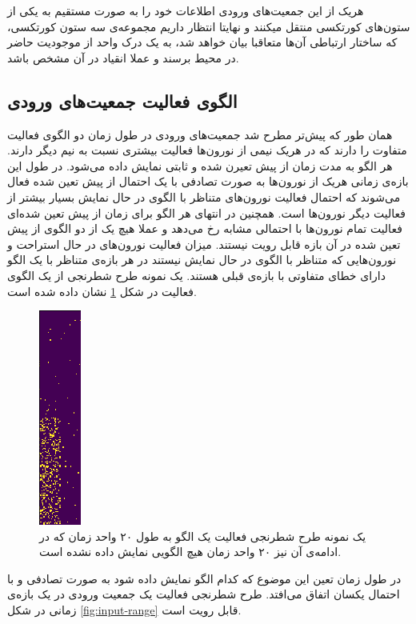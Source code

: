 \documentclass[12pt]{report}
\begin{document}
	هریک از این جمعیت‌های ورودی اطلاعات خود‌ را به صورت مستقیم به یکی از ستون‌های کورتکسی منتقل میکنند و نهایتا انتظار داریم مجموعه‌ی سه ستون کورتکسی، که ساختار ارتباطی آن‌ها متعاقبا بیان خواهد شد، به یک درک واحد از موجودیت حاضر در محیط برسند و عملا انقیاد در آن مشخص باشد.
	
	
	\subsection{الگوی فعالیت جمعیت‌های ورودی}
	
	همان طور که پیش‌تر مطرح شد جمعیت‌های ورودی در طول زمان دو الگوی فعالیت متفاوت را دارند که در هر‌یک نیمی از نورون‌ها فعالیت بیشتری نسبت به نیم دیگر دارند. هر الگو به مدت زمان از پیش تعیرن شده و ثابتی نمایش داده می‌شود. در طول این بازه‌ی زمانی هریک از نورون‌ها به صورت تصادفی با یک احتمال از پیش تعین شده فعال می‌شوند که احتمال فعالیت نورون‌های متناظر با الگوی در حال نمایش بسیار بیشتر از فعالیت دیگر نورون‌ها است. همچنین در انتهای هر الگو برای زمان از پیش تعین شده‌ای فعالیت تمام نورون‌ها با احتمالی مشابه رخ می‌دهد  و عملا هیچ یک از دو الگوی از پیش تعین شده در آن بازه قابل رویت نیستند. میزان فعالیت نورون‌های در حال استراحت و نورون‌هایی که متناظر با الگوی در حال نمایش نیستند در هر بازه‌ی متناظر با یک الگو دارای خطای متفاوتی با بازه‌ی قبلی هستند. یک نمونه طرح شطرنجی از یک الگوی فعالیت در شکل \ref{fig:input-single} نشان داده شده است.
	
\begin{figure}[H]
	\centering
	\includegraphics[width=0.1\linewidth]{input-single.png}
	\caption[NS]{
		یک نمونه طرح شطرنجی فعالیت یک الگو به طول ۲۰ واحد زمان که در ادامه‌ی آن نیز ۲۰ واحد زمان هیچ الگویی نمایش داده نشده است.
	}
	\label{fig:input-single} 
\end{figure}
	
	در طول زمان تعین این موضوع که کدام الگو نمایش داده شود به صورت تصادفی و با احتمال یکسان اتفاق می‌افتد. طرح شطرنجی فعالیت یک جمعیت ورودی در یک بازه‌ی زمانی در شکل \ref{fig:input-range} قابل رویت است.
	
\end{document}
